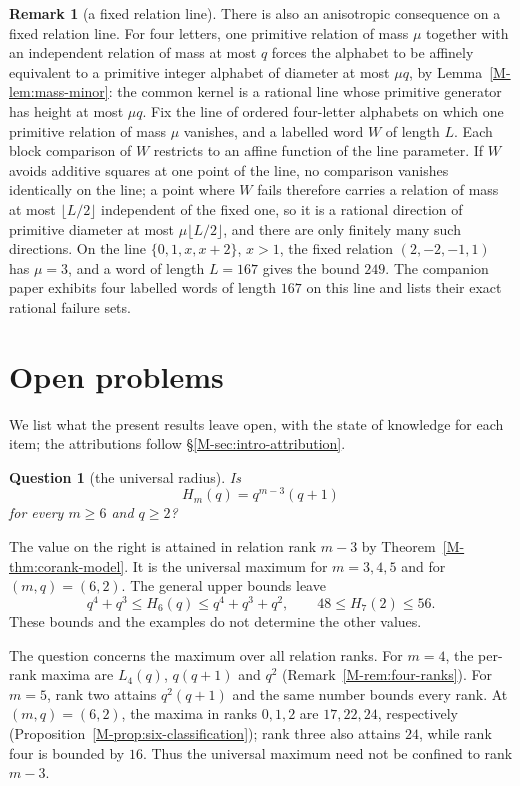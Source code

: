 \documentclass[11pt,reqno]{amsart}
\theoremstyle{plain}
\newtheorem{question}[theorem]{Question}
\theoremstyle{definition}
\newtheorem{remark}[theorem]{Remark}
\theoremstyle{plain}
\theoremstyle{plain}
\theoremstyle{plain}
\theoremstyle{plain}
\theoremstyle{plain}
\theoremstyle{plain}
\theoremstyle{definition}
\theoremstyle{definition}
\theoremstyle{definition}
\theoremstyle{plain}
\begin{document}
\begin{remark}[a fixed relation line]\label{M-rem:relation-line}
There is also an anisotropic consequence on a fixed relation line. For four
letters, one primitive relation of mass $\mu$ together with an independent
relation of mass at most $q$ forces the alphabet to be affinely equivalent
to a primitive integer alphabet of diameter at most $\mu q$, by
Lemma~\ref{M-lem:mass-minor}: the common kernel is a rational line whose
primitive generator has height at most $\mu q$. Fix the line of ordered
four-letter alphabets on which one primitive relation of mass $\mu$
vanishes, and a labelled word $W$ of length $L$. Each block comparison of
$W$ restricts to an affine function of the line parameter. If $W$ avoids additive squares
at one point of the line, no comparison vanishes identically on the line;
a point where $W$ fails therefore carries a relation of mass at most
$\lfloor L/2\rfloor$ independent of the fixed one, so it is a rational
direction of primitive diameter at most $\mu\lfloor L/2\rfloor$, and there
are only finitely many such directions. On the line $\{0,1,x,x+2\}$,
$x>1$, the fixed relation $(2,-2,-1,1)$ has $\mu=3$, and a word of length
$L=167$ gives the bound $249$. The companion paper \cite{M-Spec26} exhibits
four labelled words of length $167$ on this line and lists their exact
rational failure sets.
\end{remark}

\section{Open problems}\label{M-sec:open}

We list what the present results leave open, with the state of knowledge
for each item; the attributions follow \S\ref{M-sec:intro-attribution}.

\begin{question}[the universal radius]\label{M-q:six}\label{M-q:stratum}
Is
\[
 H_m(q)=q^{m-3}(q+1)
\]
for every $m\ge6$ and $q\ge2$?
\end{question}
The value on the right is attained in relation rank $m-3$ by
Theorem~\ref{M-thm:corank-model}. It is the universal maximum for
$m=3,4,5$ and for $(m,q)=(6,2)$. The general upper bounds leave
\[
 q^4+q^3\le H_6(q)\le q^4+q^3+q^2,
 \qquad 48\le H_7(2)\le56.
\]
These bounds and the examples do not determine the other values.

The question concerns the maximum over all relation ranks. For $m=4$,
the per-rank maxima are $L_4(q)$, $q(q+1)$ and $q^2$
(Remark~\ref{M-rem:four-ranks}). For $m=5$, rank two attains $q^2(q+1)$
and the same number bounds every rank. At $(m,q)=(6,2)$, the maxima in
ranks $0,1,2$ are $17,22,24$, respectively
(Proposition~\ref{M-prop:six-classification}); rank three also attains
$24$, while rank four is bounded by $16$. Thus the universal maximum
need not be confined to rank $m-3$.
\end{document}
